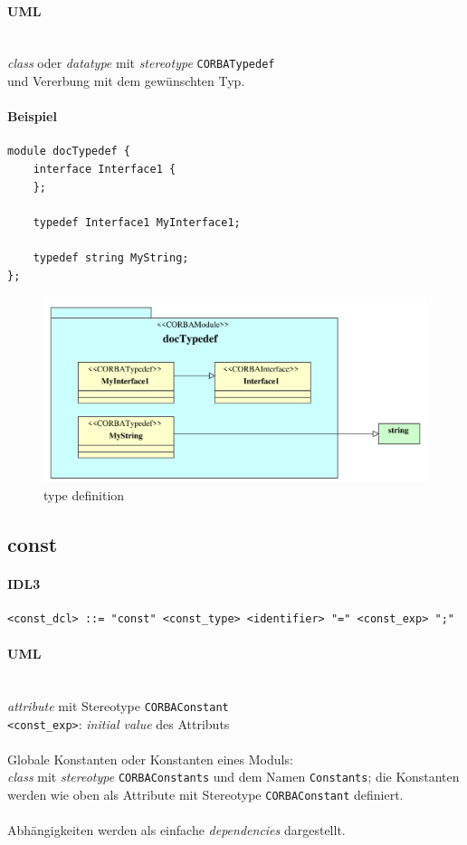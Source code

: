 \documentclass [a4paper,10pt] {scrartcl}
\begin{document}
\paragraph{UML}~\\
\emph{class} oder \emph{datatype} mit \emph{stereotype} \texttt{CORBATypedef}\\
und Vererbung mit dem gew{\"u}nschten Typ.\\
\paragraph{Beispiel}
\begin{verbatim}
module docTypedef {
    interface Interface1 {
    };

    typedef Interface1 MyInterface1;

    typedef string MyString;
};
\end{verbatim}
\begin{figure}[!h]
\centerline{\includegraphics[width=0.9 \linewidth]{docTypedef}}
\caption{type definition}
\label{fig:typedef}
\end{figure}

\cleardoublepage
\subsection{const}
\paragraph{IDL3}
\begin{verbatim}
<const_dcl> ::= "const" <const_type> <identifier> "=" <const_exp> ";"
\end{verbatim}
\paragraph{UML}~\\
\emph{attribute} mit Stereotype \texttt{CORBAConstant}\\
\verb"<const_exp>": \emph{initial value} des Attributs\\
~\\
Globale Konstanten oder Konstanten eines Moduls:\\
\emph{class} mit \emph{stereotype} \texttt{CORBAConstants} und dem Namen \texttt{Constants};
die Konstanten werden wie oben als Attribute mit Stereotype \texttt{CORBAConstant} definiert.\\
~\\
Abh{\"a}ngigkeiten werden als einfache \emph{dependencies} dargestellt.\\
\end{document}
